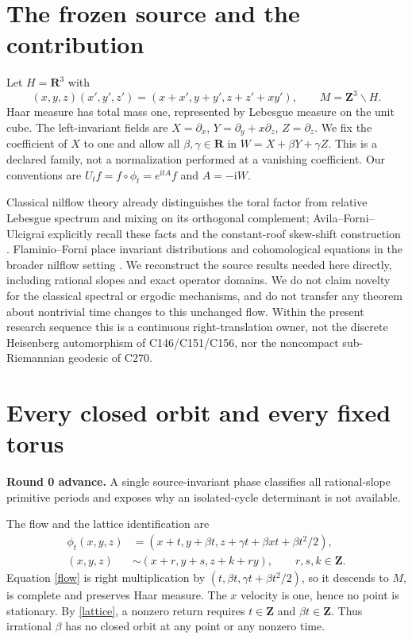 \documentclass[10pt]{article}
\newcommand{\R}{\mathbf R}
\newcommand{\Z}{\mathbf Z}
\newcommand{\ii}{\mathrm i}
\begin{document}
\section{The frozen source and the contribution}
Let $H=\R^3$ with
\[
 (x,y,z)(x',y',z')=(x+x',y+y',z+z'+xy'),\qquad
 M=\Z^3\backslash H.
\]
Haar measure has total mass one, represented by Lebesgue measure on the
unit cube. The left-invariant fields are
$X=\partial_x$, $Y=\partial_y+x\partial_z$, $Z=\partial_z$.
We fix the coefficient of $X$ to one and allow all $\beta,\gamma\in\R$ in
$W=X+\beta Y+\gamma Z$. This is a declared family, not a normalization
performed at a vanishing coefficient. Our conventions are
$U_tf=f\circ\phi_t=e^{\ii tA}f$ and $A=-\ii W$.

Classical nilflow theory already distinguishes the toral factor from
relative Lebesgue spectrum and mixing on its orthogonal complement;
Avila--Forni--Ulcigrai explicitly recall these facts and the constant-roof
skew-shift construction \cite[Sections 2.1--2.2]{afu}.
Flaminio--Forni place invariant distributions and cohomological equations
in the broader nilflow setting \cite{ff}.
We reconstruct the source results needed here directly, including rational
slopes and exact operator domains. We do not claim novelty for the classical
spectral or ergodic mechanisms, and do not transfer any theorem about
nontrivial time changes to this unchanged flow.
Within the present research sequence this is a continuous right-translation
owner, not the discrete Heisenberg automorphism of C146/C151/C156, nor the
noncompact sub-Riemannian geodesic of C270.

\section{Every closed orbit and every fixed torus}
\noindent\textbf{Round 0 advance.}
A single source-invariant phase classifies all rational-slope primitive
periods and exposes why an isolated-cycle determinant is not available.

The flow and the lattice identification are
\begin{align}
 \phi_t(x,y,z)&=(x+t,y+\beta t,z+\gamma t+\beta xt+\beta t^2/2),\label{flow}\\
 (x,y,z)&\sim(x+r,y+s,z+k+ry),\qquad r,s,k\in\Z.\label{lattice}
\end{align}
Equation \eqref{flow} is right multiplication by
$(t,\beta t,\gamma t+\beta t^2/2)$, so it descends to $M$, is complete
and preserves Haar measure. The $x$ velocity is one, hence no point is
stationary. By \eqref{lattice}, a nonzero return requires
$t\in\Z$ and $\beta t\in\Z$. Thus irrational $\beta$ has no closed orbit
at any point or any nonzero time.
\end{document}

